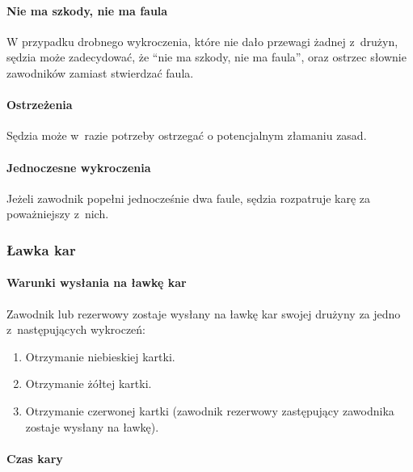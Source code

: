 \documentclass[12pt]{article}
\begin{document}
\paragraph{Nie ma szkody, nie ma faula}
W przypadku drobnego
wykroczenia, które nie dało przewagi żadnej z~drużyn, sędzia może
zadecydować, że ``nie ma szkody, nie ma faula'', oraz ostrzec słownie
zawodników zamiast stwierdzać faula.

\paragraph{Ostrzeżenia}
Sędzia może w~razie potrzeby ostrzegać
o potencjalnym złamaniu zasad.

\paragraph{Jednoczesne wykroczenia}
Jeżeli zawodnik popełni
jednocześnie dwa faule, sędzia rozpatruje karę za poważniejszy z~nich.

\subsubsection{Ławka kar}

\paragraph{Warunki wysłania na ławkę kar}
Zawodnik lub rezerwowy
zostaje wysłany na ławkę kar swojej drużyny za jedno z~następujących
wykroczeń:

\begin{enumerate}
	\item Otrzymanie niebieskiej kartki.

	\item Otrzymanie żółtej kartki.

	\item Otrzymanie czerwonej kartki (zawodnik rezerwowy zastępujący zawodnika
	      zostaje wysłany na ławkę).
\end{enumerate}

\paragraph{Czas kary}
\end{document}
